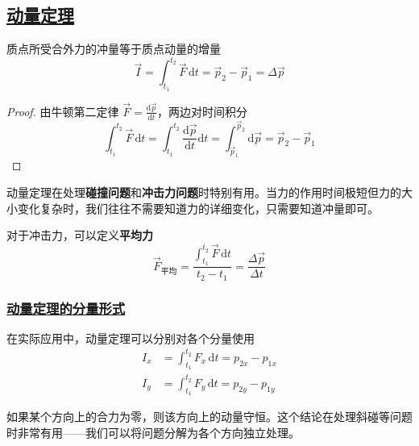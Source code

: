 \subsection{\protect\hyperlink{:}{动量定理}}

\begin{theorem}
    质点所受合外力的冲量等于质点动量的增量
    \begin{equation}
        \boxed{\vec{I} = \int_{t_1}^{t_2} \vec{F}\,\mathrm{d}t = \vec{p}_2 - \vec{p}_1 = \Delta\vec{p}}
    \end{equation}
\end{theorem}

\begin{proof}
    由牛顿第二定律 $\vec{F} = \frac{\mathrm{d}\vec{p}}{\mathrm{d}t}$，两边对时间积分
    \begin{equation}
        \int_{t_1}^{t_2} \vec{F}\,\mathrm{d}t = \int_{t_1}^{t_2} \frac{\mathrm{d}\vec{p}}{\mathrm{d}t}\mathrm{d}t = \int_{\vec{p}_1}^{\vec{p}_2} \mathrm{d}\vec{p} = \vec{p}_2 - \vec{p}_1
    \end{equation}
\end{proof}

\begin{remark}
    动量定理在处理\textbf{碰撞问题}和\textbf{冲击力问题}时特别有用。当力的作用时间极短但力的大小变化复杂时，我们往往不需要知道力的详细变化，只需要知道冲量即可。
\end{remark}

对于冲击力，可以定义\textbf{平均力}
\begin{equation}
    \vec{F}_{\text{平均}} = \frac{\int_{t_1}^{t_2}\vec{F}\,\mathrm{d}t}{t_2 - t_1} = \frac{\Delta\vec{p}}{\Delta t}
\end{equation}

\subsubsection{\protect\hyperlink{:}{动量定理的分量形式}}

在实际应用中，动量定理可以分别对各个分量使用
\begin{align}
    I_x &= \int_{t_1}^{t_2} F_x\,\mathrm{d}t = p_{2x} - p_{1x} \\
    I_y &= \int_{t_1}^{t_2} F_y\,\mathrm{d}t = p_{2y} - p_{1y}
\end{align}

\begin{remark}
    如果某个方向上的合力为零，则该方向上的动量守恒。这个结论在处理斜碰等问题时非常有用——我们可以将问题分解为各个方向独立处理。
\end{remark}

